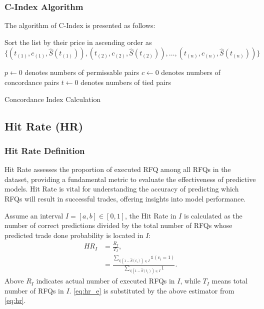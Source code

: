 \subsubsection{C-Index Algorithm}
The algorithm of C-Index is presented as follows:

\begin{algorithm}[h]
    Sort the list by their price in ascending order as \[ \{(t_{(1)}, c_{(1)}, \hat S(t_{(1)})), (t_{(2)}, c_{(2)}, \hat S(t_{(2)})), \ldots, (t_{(n)}, c_{(n)}, \hat S(t_{(n)}))\} \]
    
    $p \gets 0$ denotes numbers of permissable pairs\;
    $c \gets 0$ denotes numbers of concordance pairs\;
    $t \gets 0$ denotes numbers of tied pairs\;
    \Return{\[
        C = \frac{c + 0.5*t}{p}
        \]}
\caption{Concordance Index Calculation}
\label{alg:concordance-index}
\end{algorithm}


\subsection{Hit Rate (HR)}
\subsubsection{Hit Rate Definition}
Hit Rate assesses the proportion of executed RFQ among all RFQs in the dataset, providing a fundamental metric to evaluate the effectiveness of predictive models. Hit Rate is vital for understanding the accuracy of predicting which RFQs will result in successful trades, offering insights into model performance.

Assume an interval $I = [a, b] \in [0, 1]$, the Hit Rate in $I$ is calculated as the number of correct predictions divided by the total number of RFQs whose predicted trade done probability is located in $I$:
\begin{align}
    HR_I &= \frac{R_I}{T_I},\label{eq:hr}\\
    &=\frac{\sum_{i|(1 - \hat S(t_i)) \in I}\mathds{1}(c_i = 1)}{\sum_{i|(1 - \hat S(t_i)) \in I} 1 }.\label{eq:hr_e}
\end{align}
Above $R_I$ indicates actual number of executed RFQs in $I$, while $T_I$ means total number of RFQs in $I$. \eqref{eq:hr_e} is substituted by the above estimator from \eqref{eq:hr}.

